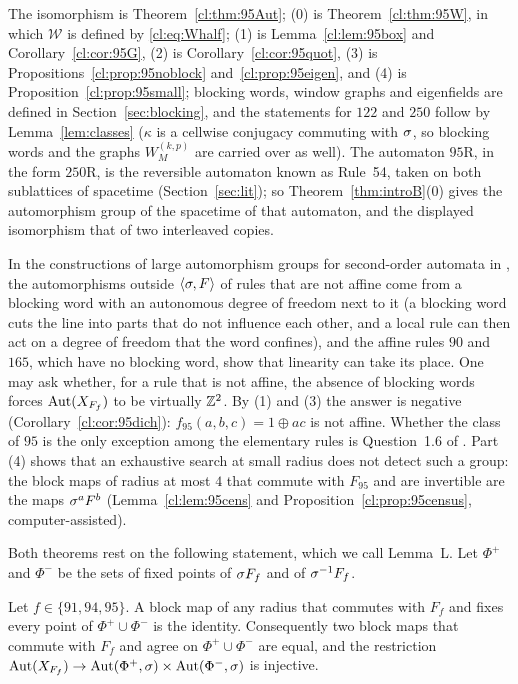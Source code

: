 The isomorphism is Theorem~\ref{cl:thm:95Aut}; (0) is Theorem~\ref{cl:thm:95W}, in which $\mathcal W$ is defined by \eqref{cl:eq:Whalf}; (1) is Lemma~\ref{cl:lem:95box} and Corollary~\ref{cl:cor:95G}, (2) is Corollary~\ref{cl:cor:95quot}, (3) is Propositions~\ref{cl:prop:95noblock} and~\ref{cl:prop:95eigen}, and (4) is Proposition~\ref{cl:prop:95small}; blocking words, window graphs and eigenfields are defined in Section~\ref{sec:blocking}, and the statements for $122$ and $250$ follow by Lemma~\ref{lem:classes} ($\kappa$ is a cellwise conjugacy commuting with $\sigma$, so blocking words and the graphs $W^{(k,p)}_M$ are carried over as well). The automaton $95$R, in the form $250$R, is the reversible automaton known as Rule~54, taken on both sublattices of spacetime (Section~\ref{sec:lit}); so Theorem~\ref{thm:introB}(0) gives the automorphism group of the spacetime of that automaton, and the displayed isomorphism that of two interleaved copies.

In the constructions of large automorphism groups for second-order automata in \cite{PaperC}, the automorphisms outside $\langle\sigma,F\rangle$ of rules that are not affine come from a blocking word \cite{Kurka1997,BT2000} with an autonomous degree of freedom next to it (a blocking word cuts the line into parts that do not influence each other, and a local rule can then act on a degree of freedom that the word confines), and the affine rules $90$ and $165$, which have no blocking word, show that linearity can take its place. One may ask whether, for a rule that is not affine, the absence of blocking words forces $\operatorname{Aut}(X_{F_f})$ to be virtually $\mathbb{Z}^2$. By (1) and (3) the answer is negative (Corollary~\ref{cl:cor:95dich}): $f_{95}(a,b,c)=1\oplus ac$ is not affine. Whether the class of $95$ is the only exception among the elementary rules is Question~1.6 of \cite{PaperC}. Part (4) shows that an exhaustive search at small radius does not detect such a group: the block maps of radius at most $4$ that commute with $F_{95}$ and are invertible are the maps $\sigma^aF^b$ (Lemma~\ref{cl:lem:95cens} and Proposition~\ref{cl:prop:95census}, computer-assisted).

Both theorems rest on the following statement, which we call Lemma~L. Let $\Phi^+$ and $\Phi^-$ be the sets of fixed points of $\sigma F_f$ and of $\sigma^{-1}F_f$.

\begin{thmx}[Lemma L]\label{thm:introC}
Let $f\in\{91,94,95\}$. A block map of any radius that commutes with $F_f$ and fixes every point of $\Phi^+\cup\Phi^-$ is the identity. Consequently two block maps that commute with $F_f$ and agree on $\Phi^+\cup\Phi^-$ are equal, and the restriction $\operatorname{Aut}(X_{F_f})\to\operatorname{Aut}(\Phi^+,\sigma)\times\operatorname{Aut}(\Phi^-,\sigma)$ is injective.
\end{thmx}

